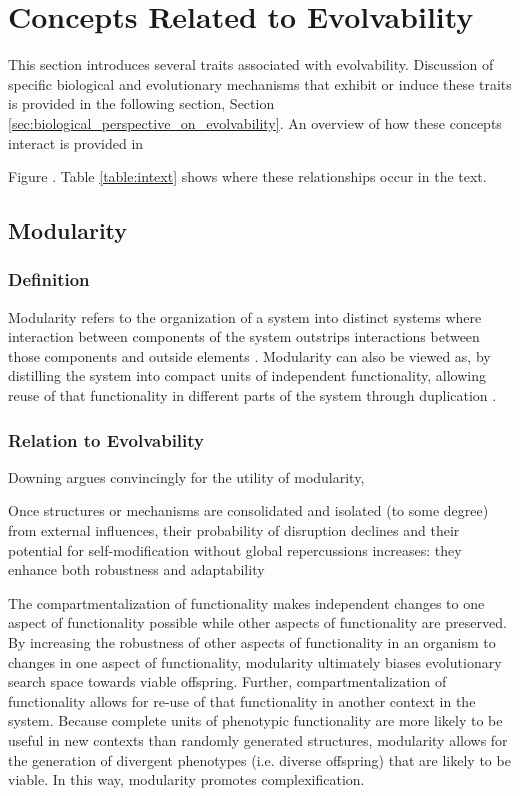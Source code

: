\section{Concepts Related to Evolvability} \label{sec:concepts_related_to_evolvability}
This section introduces several traits associated with evolvability. Discussion of specific biological and evolutionary mechanisms that exhibit or induce these traits is provided in the following section, Section \ref{sec:biological_perspective_on_evolvability}. An overview of how these concepts interact is provided in 
\begin{samepage}
Figure . Table \ref{table:intext} shows where these relationships occur in the text.
\printindex[mindmap]{}
\end{samepage}

\subsection{Modularity} \label{sec:modularity}
\subsubsection{Definition}
Modularity refers to the organization of a system into distinct systems where interaction between components of the system outstrips interactions between those components and outside elements \cite[p 207]{Downing2015IntelligenceSystems}. Modularity can also be viewed as, by distilling the system into compact units of independent functionality, allowing reuse of that functionality in different parts of the system through duplication \cite{Reisinger2005TowardsEvolvability}.

\subsubsection{Relation to Evolvability}
Downing argues convincingly for the utility of modularity,
\begin{displayquote}
Once structures or mechanisms are consolidated and isolated (to some degree) from external influences, their probability of disruption declines and their potential for self-modification without global repercussions increases: they enhance both robustness and adaptability \cite[p 208]{Downing2015IntelligenceSystems}
\end{displayquote}
The compartmentalization of functionality makes independent changes to one aspect of functionality possible while other aspects of functionality are preserved. By increasing the robustness of other aspects of functionality in an organism to changes in one aspect of functionality, modularity ultimately biases evolutionary search space towards viable offspring. \mindmapmark{\robustnessmodularity} Further, compartmentalization of functionality allows for re-use of that functionality in another context in the system. Because complete units of phenotypic functionality are more likely to be useful in new contexts than randomly generated structures, modularity allows for the generation of divergent phenotypes (i.e. diverse offspring) that are likely to be viable. In this way, modularity promotes complexification.\mindmapmark{\complexificationmodularity}

